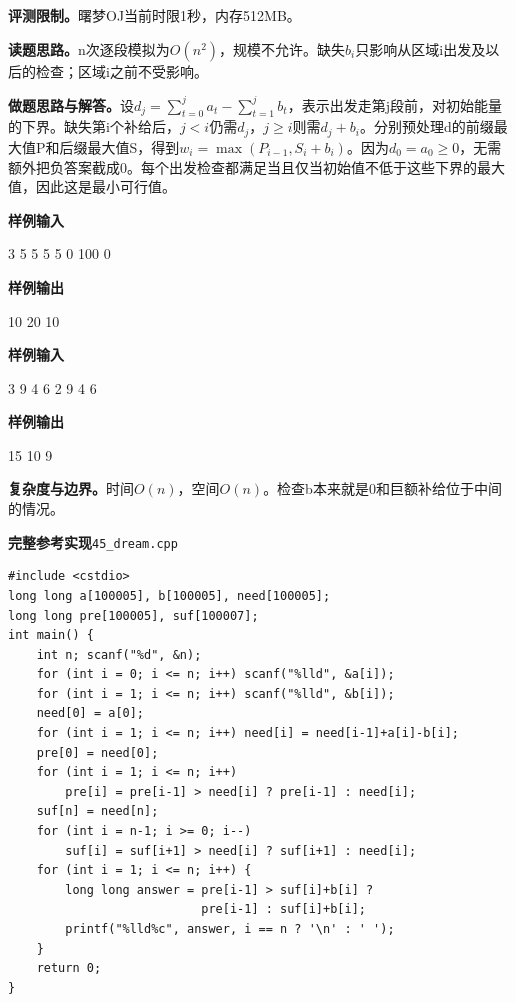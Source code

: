 \documentclass[UTF8,11pt,a4paper,fontset=none]{ctexart}
\begin{document}
\noindent\textbf{评测限制。}曙梦OJ当前时限1秒，内存512MB。

\noindent\textbf{读题思路。}n次逐段模拟为$O(n^2)$，规模不允许。缺失$b_i$只影响从区域i出发及以后的检查；区域i之前不受影响。

\noindent\textbf{做题思路与解答。}设$d_j=\sum_{t=0}^j a_t-\sum_{t=1}^j b_t$，表示出发走第j段前，对初始能量的下界。缺失第i个补给后，$j<i$仍需$d_j$，$j\ge i$则需$d_j+b_i$。分别预处理d的前缀最大值P和后缀最大值S，得到$w_i=\max(P_{i-1},S_i+b_i)$。因为$d_0=a_0\ge0$，无需额外把负答案截成0。每个出发检查都满足当且仅当初始值不低于这些下界的最大值，因此这是最小可行值。
\begin{tcolorbox}[samplebox,title={输入输出样例}]
\textbf{样例输入}
\begin{Sample}
3
5 5 5 5
0 100 0
\end{Sample}
\tcblower
\textbf{样例输出}
\begin{Sample}
10 20 10
\end{Sample}
\end{tcolorbox}
\begin{tcolorbox}[samplebox,title={输入输出样例}]
\textbf{样例输入}
\begin{Sample}
3
9 4 6 2
9 4 6
\end{Sample}
\tcblower
\textbf{样例输出}
\begin{Sample}
15 10 9
\end{Sample}
\end{tcolorbox}

\noindent\textbf{复杂度与边界。}时间$O(n)$，空间$O(n)$。检查b本来就是0和巨额补给位于中间的情况。
\par\noindent\begin{minipage}{\linewidth}
\textbf{完整参考实现}\quad\texttt{45\_dream.cpp}
\begin{lstlisting}
#include <cstdio>
long long a[100005], b[100005], need[100005];
long long pre[100005], suf[100007];
int main() {
    int n; scanf("%d", &n);
    for (int i = 0; i <= n; i++) scanf("%lld", &a[i]);
    for (int i = 1; i <= n; i++) scanf("%lld", &b[i]);
    need[0] = a[0];
    for (int i = 1; i <= n; i++) need[i] = need[i-1]+a[i]-b[i];
    pre[0] = need[0];
    for (int i = 1; i <= n; i++)
        pre[i] = pre[i-1] > need[i] ? pre[i-1] : need[i];
    suf[n] = need[n];
    for (int i = n-1; i >= 0; i--)
        suf[i] = suf[i+1] > need[i] ? suf[i+1] : need[i];
    for (int i = 1; i <= n; i++) {
        long long answer = pre[i-1] > suf[i]+b[i] ?
                           pre[i-1] : suf[i]+b[i];
        printf("%lld%c", answer, i == n ? '\n' : ' ');
    }
    return 0;
}
\end{lstlisting}
\end{minipage}\par
\end{document}
